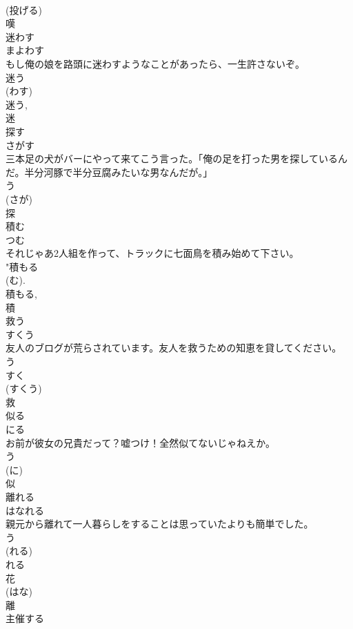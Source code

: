 \documentclass[8pt]{extreport}
\begin{document}
\begin{CJK}{UTF8}{min}
\\	(投げる) 
\\	嘆	
\\	迷わす	
\\	まよわす	
\\	もし俺の娘を路頭に迷わすようなことがあったら、一生許さないぞ。	
\\	迷う 
\\	(わす) 
\\	迷う, 
\\	迷	
\\	探す	
\\	さがす	
\\	三本足の犬がバーにやって来てこう言った。「俺の足を打った男を探しているんだ。半分河豚で半分豆腐みたいな男なんだが。」	
\\	う 
\\	(さが) 
\\	探	
\\	積む	
\\	つむ	
\\	それじゃあ2人組を作って、トラックに七面鳥を積み始めて下さい。	
\\	"積もる 
\\	(む). 
\\	積もる, 
\\	積	
\\	救う	
\\	すくう	
\\	友人のブログが荒らされています。友人を救うための知恵を貸してください。	
\\	う 
\\	すく 
\\	(すくう) 
\\	救	
\\	似る	
\\	にる	
\\	お前が彼女の兄貴だって？嘘つけ！全然似てないじゃねえか。	
\\	う 
\\	(に) 
\\	似	
\\	離れる	
\\	はなれる	
\\	親元から離れて一人暮らしをすることは思っていたよりも簡単でした。	
\\	う 
\\	(れる) 
\\	れる 
\\	花
\\	(はな) 
\\	離	
\\	主催する	

\end{CJK}
\end{document}

